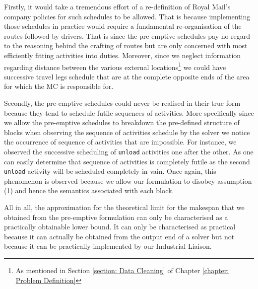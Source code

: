 \vspace{\baselineskip}
\noindent
Firstly, it would take a tremendous effort of a re-definition of Royal Mail's company policies for such schedules to be allowed. That is because implementing those schedules in practice would require a fundamental re-organisation of the routes followed by drivers. That is since the pre-emptive schedules pay no regard to the reasoning behind the crafting of routes but are only concerned with most efficiently fitting activities into duties. Moreover, since we neglect information regarding distance between the various external locations\footnote{As mentioned in Section \ref{section: Data Cleaning} of Chapter \ref{chapter: Problem Definition}} we could have successive travel legs schedule that are at the complete opposite ends of the area for which the MC is responsible for.

\vspace{\baselineskip}
\noindent
Secondly, the pre-emptive schedules could never be realised in their true form because they tend to schedule futile sequences of activities. More specifically since we allow the pre-emptive schedules to breakdown the pre-defined structure of blocks when observing the sequence of activities schedule by the solver we notice the occurrence of sequence of activities that are impossible. For instance, we observed the successive scheduling of \texttt{unload} activities one after the other. As one can easily determine that sequence of activities is completely futile as the second \texttt{unload} activity will be scheduled completely in vain. Once again, this phenomenon is observed because we allow our formulation to disobey assumption (1) and hence the semantics associated with each block.

\vspace{\baselineskip}
\noindent
All in all, the approximation for the theoretical limit for the makespan that we obtained from the pre-emptive formulation can only be characterised as a practically obtainable lower bound. It can only be characterised as practical because it can actually be obtained from the output end of a solver but not because it can be practically implemented by our Industrial Liaison. 



